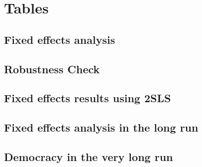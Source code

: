\documentclass[11pt, a4paper, leqno]{article}
\begin{document}
\newpage{}

\section{Tables}

\subsection{Fixed effects analysis}




\newpage{}

\subsection{Robustness Check}




\newpage{}


\subsection{Fixed effects results using 2SLS}





\newpage{}






\subsection{Fixed effects analysis in the long run}




\subsection{Democracy in the very long run}





\clearpage
{}
\printbibliography
{}

\end{document}
